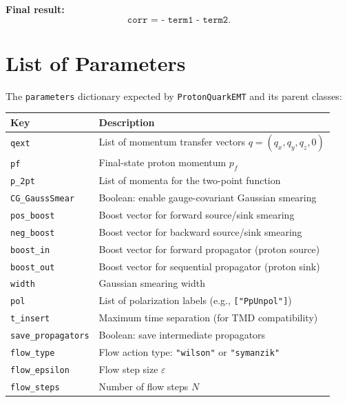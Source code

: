 \documentclass[11pt,a4paper]{article}
\begin{document}
\medskip\noindent
\textbf{Final result:}
\begin{equation}
  \texttt{corr = - term1 - term2}.
\end{equation}

\section{List of Parameters}

The \texttt{parameters} dictionary expected by \texttt{ProtonQuarkEMT} and its
parent classes:

\begin{center}
\begin{tabular}{ll}
\toprule
Key & Description \\
\midrule
\texttt{qext} & List of momentum transfer vectors $q = (q_{x},q_{y},q_{z},0)$ \\
\texttt{pf} & Final-state proton momentum $p_{f}$ \\
\texttt{p\_2pt} & List of momenta for the two-point function \\
\texttt{CG\_GaussSmear} & Boolean: enable gauge-covariant Gaussian smearing \\
\texttt{pos\_boost} & Boost vector for forward source/sink smearing \\
\texttt{neg\_boost} & Boost vector for backward source/sink smearing \\
\texttt{boost\_in} & Boost vector for forward propagator (proton source) \\
\texttt{boost\_out} & Boost vector for sequential propagator (proton sink) \\
\texttt{width} & Gaussian smearing width \\
\texttt{pol} & List of polarization labels (e.g., \texttt{["PpUnpol"]}) \\
\texttt{t\_insert} & Maximum time separation (for TMD compatibility) \\
\texttt{save\_propagators} & Boolean: save intermediate propagators \\
\texttt{flow\_type} & Flow action type: \texttt{"wilson"} or \texttt{"symanzik"} \\
\texttt{flow\_epsilon} & Flow step size $\varepsilon$ \\
\texttt{flow\_steps} & Number of flow steps $N$ \\
\bottomrule
\end{tabular}
\end{center}
\end{document}
